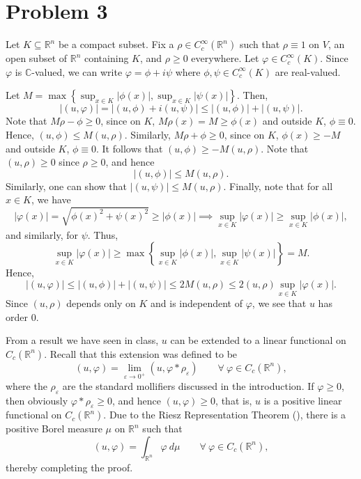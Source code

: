 \documentclass[10pt]{amsart}
\theoremstyle{thmstyle}
\theoremstyle{defstyle}
\newcommand{\R}{\mathbb{R}}
\newcommand{\bbC}{\mathbb{C}}
\renewcommand{\le}{\leqslant}
\renewcommand{\ge}{\geqslant}
\begin{document}
\section{Problem 3}

Let $K\subseteq\R^n$ be a compact subset. Fix a $\rho\in C_c^\infty(\R^n)$ such that $\rho\equiv 1$ on $V$, an open subset of $\R^n$ containing $K$, and $\rho\ge 0$ everywhere. Let $\varphi\in C_c^\infty(K)$. Since $\varphi$ is $\bbC$-valued, we can write $\varphi = \phi + i\psi$ where $\phi,\psi\in C_c^\infty(K)$ are real-valued.

Let $\displaystyle M = \max\left\{\sup_{x\in K}|\phi(x)|, \sup_{x\in K}|\psi(x)|\right\}$. Then, 
\begin{equation*}
	\left|(u, \varphi)\right| = \left|(u,\phi) + i(u, \psi)\right|\le |(u,\phi)| + |(u, \psi)|.
\end{equation*}
Note that $M\rho - \phi\ge 0$, since on $K$, $M\rho(x) = M\ge\phi(x)$ and outside $K$, $\phi\equiv 0$. Hence, $(u,\phi)\le M(u,\rho)$. Similarly, $M\rho + \phi\ge 0$, since on $K$, $\phi(x)\ge -M$ and outside $K$, $\phi\equiv 0$. It follows that $(u,\phi)\ge -M(u,\rho)$. Note that $(u,\rho)\ge 0$ since $\rho\ge 0$, and hence 
\begin{equation*}
	|(u,\phi)|\le M(u,\rho).
\end{equation*}
Similarly, one can show that $|(u,\psi)|\le M(u,\rho)$. Finally, note that for all $x\in K$, we have 
\begin{equation*}
	|\varphi(x)| = \sqrt{\phi(x)^2 + \psi(x)^2}\ge |\phi(x)|\implies\sup_{x\in K}|\varphi(x)|\ge\sup_{x\in K}|\phi(x)|,
\end{equation*}
and similarly, for $\psi$. Thus, 
\begin{equation*}
	\sup_{x\in K}|\varphi(x)|\ge\max\left\{\sup_{x\in K}|\phi(x)|, \sup_{x\in K}|\psi(x)|\right\} = M.
\end{equation*}
Hence, 
\begin{equation*}
	|(u,\varphi)|\le |(u,\phi)| + |(u,\psi)|\le 2M(u,\rho)\le 2(u,\rho)\sup_{x\in K} |\varphi(x)|.
\end{equation*}
Since $(u,\rho)$ depends only on $K$ and is independent of $\varphi$, we see that $u$ has order $0$.

From a result we have seen in class, $u$ can be extended to a linear functional on $C_c(\R^n)$. Recall that this extension was defined to be 
\begin{equation*}
	(u,\varphi) = \lim_{\varepsilon\to 0^+}(u,\varphi\ast\rho_\varepsilon)\qquad\forall~\varphi\in C_c(\R^n),
\end{equation*}
where the $\rho_\varepsilon$ are the standard mollifiers discussed in the introduction. If $\varphi\ge 0$, then obviously $\varphi\ast\rho_\varepsilon\ge 0$, and hence $(u,\varphi)\ge 0$, that is, $u$ is a positive linear functional on $C_c(\R^n)$. Due to the Riesz Representation Theorem (\cite[Theorem 2.14]{papa-rudin}), there is a positive Borel measure $\mu$ on $\R^n$ such that 
\begin{equation*}
	(u,\varphi) = \int_{\R^n} \varphi~d\mu\qquad\forall~\varphi\in C_c(\R^n),
\end{equation*}
thereby completing the proof.
\end{document}
